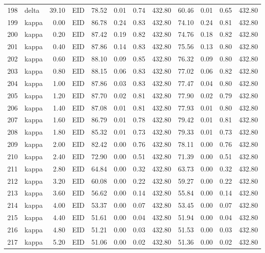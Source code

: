 \begin{table}[ht]
\begin{tabular}{rlrlrrrrrrrr}
  198 & delta & 39.10 & EID & 78.52 & 0.01 & 0.74 & 432.80 & 60.46 & 0.01 & 0.65 & 432.80 \\ 
  199 & kappa & 0.00 & EID & 86.78 & 0.24 & 0.83 & 432.80 & 74.10 & 0.24 & 0.81 & 432.80 \\ 
  200 & kappa & 0.20 & EID & 87.42 & 0.19 & 0.82 & 432.80 & 74.76 & 0.18 & 0.82 & 432.80 \\ 
  201 & kappa & 0.40 & EID & 87.86 & 0.14 & 0.83 & 432.80 & 75.56 & 0.13 & 0.80 & 432.80 \\ 
  202 & kappa & 0.60 & EID & 88.10 & 0.09 & 0.85 & 432.80 & 76.32 & 0.09 & 0.80 & 432.80 \\ 
  203 & kappa & 0.80 & EID & 88.15 & 0.06 & 0.83 & 432.80 & 77.02 & 0.06 & 0.82 & 432.80 \\ 
  204 & kappa & 1.00 & EID & 87.86 & 0.03 & 0.83 & 432.80 & 77.47 & 0.04 & 0.80 & 432.80 \\ 
  205 & kappa & 1.20 & EID & 87.70 & 0.02 & 0.81 & 432.80 & 77.90 & 0.02 & 0.79 & 432.80 \\ 
  206 & kappa & 1.40 & EID & 87.08 & 0.01 & 0.81 & 432.80 & 77.93 & 0.01 & 0.80 & 432.80 \\ 
  207 & kappa & 1.60 & EID & 86.79 & 0.01 & 0.78 & 432.80 & 79.42 & 0.01 & 0.81 & 432.80 \\ 
  208 & kappa & 1.80 & EID & 85.32 & 0.01 & 0.73 & 432.80 & 79.33 & 0.01 & 0.73 & 432.80 \\ 
  209 & kappa & 2.00 & EID & 82.42 & 0.00 & 0.76 & 432.80 & 78.11 & 0.00 & 0.76 & 432.80 \\ 
  210 & kappa & 2.40 & EID & 72.90 & 0.00 & 0.51 & 432.80 & 71.39 & 0.00 & 0.51 & 432.80 \\ 
  211 & kappa & 2.80 & EID & 64.84 & 0.00 & 0.32 & 432.80 & 63.73 & 0.00 & 0.32 & 432.80 \\ 
  212 & kappa & 3.20 & EID & 60.08 & 0.00 & 0.22 & 432.80 & 59.27 & 0.00 & 0.22 & 432.80 \\ 
  213 & kappa & 3.60 & EID & 56.62 & 0.00 & 0.14 & 432.80 & 55.84 & 0.00 & 0.14 & 432.80 \\ 
  214 & kappa & 4.00 & EID & 53.37 & 0.00 & 0.07 & 432.80 & 53.45 & 0.00 & 0.07 & 432.80 \\ 
  215 & kappa & 4.40 & EID & 51.61 & 0.00 & 0.04 & 432.80 & 51.94 & 0.00 & 0.04 & 432.80 \\ 
  216 & kappa & 4.80 & EID & 51.21 & 0.00 & 0.03 & 432.80 & 51.53 & 0.00 & 0.03 & 432.80 \\ 
  217 & kappa & 5.20 & EID & 51.06 & 0.00 & 0.02 & 432.80 & 51.36 & 0.00 & 0.02 & 432.80 \\ 

\end{tabular}
\end{table}
